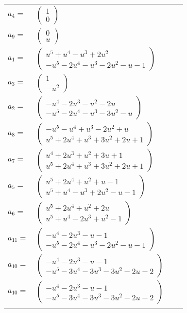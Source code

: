\documentclass[1p]{elsarticle_modified}
\theoremstyle{definition}
\begin{document}
\begin{tabular}{m{7pt} m{180pt} m{7pt} m{180pt} }
\flushright $a_{4}=$&$\begin{pmatrix}1\\0\end{pmatrix}$ \\
\flushright $a_{9}=$&$\begin{pmatrix}0\\u\end{pmatrix}$ \\
\flushright $a_{1}=$&$\begin{pmatrix}u^5+u^4- u^3+2 u^2\\- u^5-2 u^4- u^3-2 u^2- u-1\end{pmatrix}$ \\
\flushright $a_{3}=$&$\begin{pmatrix}1\\- u^2\end{pmatrix}$ \\
\flushright $a_{2}=$&$\begin{pmatrix}- u^4-2 u^3- u^2-2 u\\- u^5-2 u^4- u^3-3 u^2- u\end{pmatrix}$ \\
\flushright $a_{8}=$&$\begin{pmatrix}- u^5- u^4+u^3-2 u^2+u\\u^5+2 u^4+u^3+3 u^2+2 u+1\end{pmatrix}$ \\
\flushright $a_{7}=$&$\begin{pmatrix}u^4+2 u^3+u^2+3 u+1\\u^5+2 u^4+u^3+3 u^2+2 u+1\end{pmatrix}$ \\
\flushright $a_{5}=$&$\begin{pmatrix}u^5+2 u^4+u^2+u-1\\u^5+u^4- u^3+2 u^2- u-1\end{pmatrix}$ \\
\flushright $a_{6}=$&$\begin{pmatrix}u^5+2 u^4+u^2+2 u\\u^5+u^4-2 u^3+u^2-1\end{pmatrix}$ \\
\flushright $a_{11}=$&$\begin{pmatrix}- u^4-2 u^3- u-1\\- u^5-2 u^4- u^3-2 u^2- u-1\end{pmatrix}$ \\
\flushright $a_{10}=$&$\begin{pmatrix}- u^4-2 u^3- u-1\\- u^5-3 u^4-3 u^3-3 u^2-2 u-2\end{pmatrix}$\\ \flushright $a_{10}=$&$\begin{pmatrix}- u^4-2 u^3- u-1\\- u^5-3 u^4-3 u^3-3 u^2-2 u-2\end{pmatrix}$\\&\end{tabular}
\end{document}
